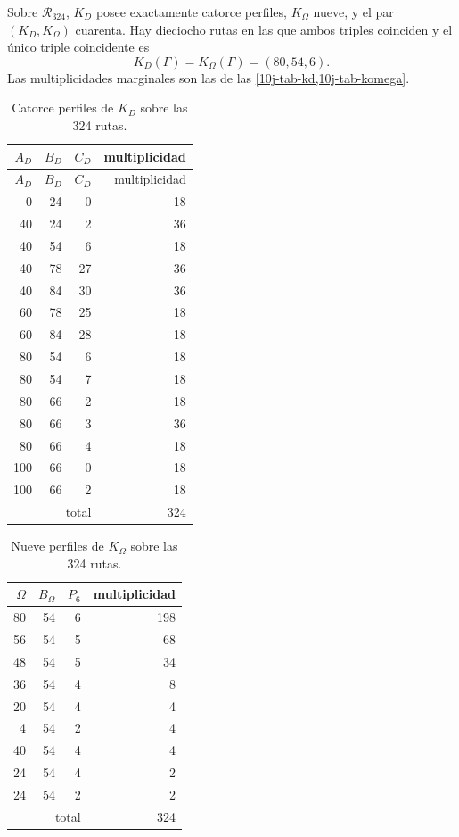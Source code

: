 \begin{theorem}
\label{10j-thm-censo-lectores}
Sobre \(\mathcal R_{324}\), \(K_D\) posee exactamente catorce perfiles,
\(K_\Omega\) nueve, y el par \((K_D,K_\Omega)\) cuarenta. Hay dieciocho
rutas en las que ambos triples coinciden y el único triple coincidente es
\begin{equation}
 K_D(\Gamma)=K_\Omega(\Gamma)=(80,54,6).
 \label{10j-eq-unica-coincidencia}
\end{equation}
Las multiplicidades marginales son las de las
\cref{10j-tab-kd,10j-tab-komega}.
\end{theorem}

\begin{longtable}{@{}rrr r@{}}
\caption{Catorce perfiles de \(K_D\) sobre las 324 rutas.}
\label{10j-tab-kd}\\
\toprule
\(A_D\)&\(B_D\)&\(C_D\)&multiplicidad\\
\midrule
\endfirsthead
\toprule
\(A_D\)&\(B_D\)&\(C_D\)&multiplicidad\\
\midrule
\endhead
0&24&0&18\\
40&24&2&36\\
40&54&6&18\\
40&78&27&36\\
40&84&30&36\\
60&78&25&18\\
60&84&28&18\\
80&54&6&18\\
80&54&7&18\\
80&66&2&18\\
80&66&3&36\\
80&66&4&18\\
100&66&0&18\\
100&66&2&18\\
\midrule
\multicolumn{3}{r}{total}&324\\
\bottomrule
\end{longtable}

\begin{table}[htbp]
\centering
\caption{Nueve perfiles de \(K_\Omega\) sobre las 324 rutas.}
\label{10j-tab-komega}
\begin{tabular}{@{}rrr r@{}}
\toprule
\(\Omega\)&\(B_\Omega\)&\(P_6\)&multiplicidad\\
\midrule
80&54&6&198\\
56&54&5&68\\
48&54&5&34\\
36&54&4&8\\
20&54&4&4\\
4&54&2&4\\
40&54&4&4\\
24&54&4&2\\
24&54&2&2\\
\midrule
\multicolumn{3}{r}{total}&324\\
\bottomrule
\end{tabular}
\end{table}

